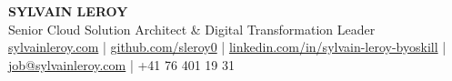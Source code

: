 \documentclass[10pt]{article}
\begin{document}

\begin{center}
{\color{title}\fontsize{26pt}{30pt}\selectfont\bfseries SYLVAIN LEROY}\\[0.5pt]
{\fontsize{9pt}{10.5pt}\selectfont Senior Cloud Solution Architect \& Digital Transformation Leader}\\[0.5pt]
{\fontsize{7pt}{8pt}\selectfont 
\href{https://sylvainleroy.com}{sylvainleroy.com} | 
\href{https://www.github.com/sleroy0}{github.com/sleroy0} | 
\href{https://www.linkedin.com/in/sylvain-leroy-byoskill}{linkedin.com/in/sylvain-leroy-byoskill} | 
\href{mailto:job@sylvainleroy.com}{job@sylvainleroy.com} | 
+41 76 401 19 31}
\end{center}

\vspace{-0.5pt}
\noindent\makebox[\linewidth]{\color{title}\rule{\paperwidth}{0.5pt}}
\vspace{-3pt}

\end{document}
